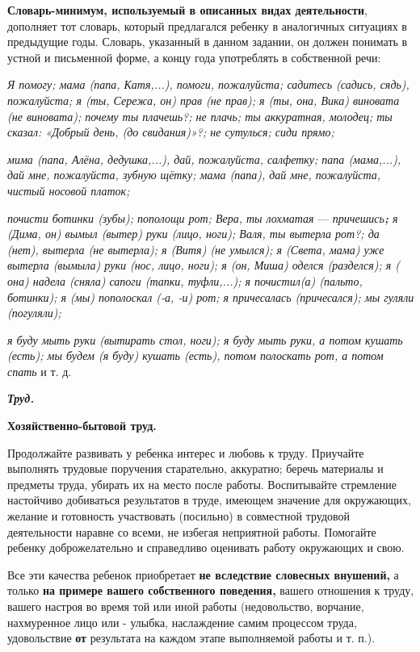 \documentclass[a5paper]{book}
\renewcommand{\emph}[1]{\textit{#1}}
\begin{document}
\textbf{Словарь-минимум, используемый в описанных видах деятельности},
дополняет тот словарь, который предлагался ребенку в аналогичных
ситуациях в предыдущие годы. Словарь, указанный в данном задании, он
должен понимать в устной и письменной форме, а концу года употреблять в
собственной речи:

\emph{Я помогу; мама (папа, Катя,...), помоги, пожалуйста; садитесь
(садись, сядь), пожалуйста; я (ты, Сережа, он) прав (не прав); я (ты,
она, Вика) виновата (не виновата); почему ты плачешь?; не плачь; ты
аккуратная, молодец; ты сказал: «Добрый день, (до свидания)»?; не
сутулься; сиди прямо;}

\emph{мима (папа, Алёна, дедушка,...), дай, пожалуйста, салфетку; папа
(мама,...), дай мне, пожалуйста, зубную щётку; мама (папа), дай мне,
пожалуйста, чистый носовой платок;}

\emph{почисти ботинки (зубы); пополощи рот; Вера, ты лохматая} ---
\emph{причешись\textbf{;} я (Дима, он) вымыл (вытер) руки (лицо, ноги);
Валя, ты вытерла рот?; да (нет), вытерла (не вытерла); я (Витя) (не
умылся); я (Света, мама) уже вытерла (вымыла) руки (нос, лицо, ноги); я
(он, Миша) оделся (разделся); я ( она) надела (сняла) сапоги (тапки,
туфли,...); я почистил(а) (пальто, ботинки); я (мы) пополоскал (-а, -и)
рот; я причесалась (причесался); мы гуляли (погуляли);}

\emph{я буду мыть руки (вытирать стол, ноги); я буду мыть руки, а потом
кушать (есть); мы будем (я буду) кушать (есть), потом полоскать рот, а
потом спать} и т. д.

\emph{\textbf{Труд.}}

\textbf{Хозяйственно-бытовой труд.}

Продолжайте развивать у ребенка интерес и любовь к труду. Приучайте
выполнять трудовые поручения старательно, аккуратно; беречь материалы и
предметы труда, убирать их на место после работы. Воспитывайте
стремление настойчиво добиваться результатов в труде, имеющем значение
для окружающих, желание и готовность участвовать (посильно) в совместной
трудовой деятельности наравне со всеми, не избегая неприятной работы.
Помогайте ребенку доброжелательно и справедливо оценивать работу
окружающих и свою.

Все эти качества ребенок приобретает \textbf{не вследствие словесных
внушений,} а только \textbf{на примере вашего собственного поведения,}
вашего отношения к труду, вашего настроя во время той или иной работы
(недовольство, ворчание, нахмуренное лицо или - улыбка, наслаждение
самим процессом труда, удовольствие \textbf{от} результата на каждом
этапе выполняемой работы и т. п.).
\end{document}
